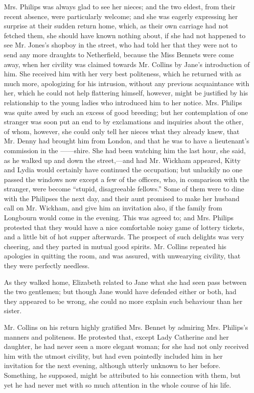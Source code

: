 Mrs. Philips was always glad to see her nieces; and the two eldest, from their recent absence, were particularly welcome; and she was eagerly expressing her surprise at their sudden return home, which, as their own carriage had not fetched them, she should have known nothing about, if she had not happened to see Mr. Jones's shopboy in the street, who had told her that they were not to send any more draughts to Netherfield, because the Miss Bennets were come away, when her civility was claimed towards Mr. Collins by Jane's introduction of him. She received him with her very best politeness, which he returned with as much more, apologizing for his intrusion, without any previous acquaintance with her, which he could not help flattering himself, however, might be justified by his relationship to the young ladies who introduced him to her notice. Mrs. Philips was quite awed by such an excess of good breeding; but her contemplation of one stranger was soon put an end to by exclamations and inquiries about the other, of whom, however, she could only tell her nieces what they already knew, that Mr. Denny had brought him from London, and that he was to have a lieutenant's commission in the ------shire. She had been watching him the last hour, she said, as he walked up and down the street,---and had Mr. Wickham appeared, Kitty and Lydia would certainly have continued the occupation; but unluckily no one passed the windows now except a few of the officers, who, in comparison with the stranger, were become ``stupid, disagreeable fellows.'' Some of them were to dine with the Philipses the next day, and their aunt promised to make her husband call on Mr. Wickham, and give him an invitation also, if the family from Longbourn would come in the evening. This was agreed to; and Mrs. Philips protested that they would have a nice comfortable noisy game of lottery tickets, and a little bit of hot supper afterwards. The prospect of such delights was very cheering, and they parted in mutual good spirits. Mr. Collins repeated his apologies in quitting the room, and was assured, with unwearying civility, that they were perfectly needless.

As they walked home, Elizabeth related to Jane what she had seen pass between the two gentlemen; but though Jane would have defended either or both, had they appeared to be wrong, she could no more explain such behaviour than her sister.

Mr. Collins on his return highly gratified Mrs. Bennet by admiring Mrs. Philips's manners and politeness. He protested that, except Lady Catherine and her daughter, he had never seen a more elegant woman; for she had not only received him with the utmost civility, but had even pointedly included him in her invitation for the next evening, although utterly unknown to her before. Something, he supposed, might be attributed to his connection with them, but yet he had never met with so much attention in the whole course of his life.


